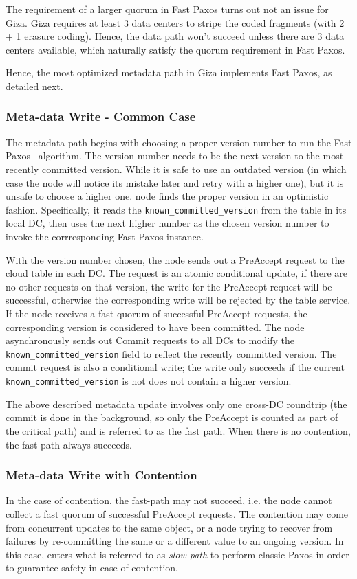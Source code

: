 The requirement of a larger quorum in Fast Paxos turns out not an issue for Giza. Giza requires at least 3 data centers to stripe the coded fragments (with 2 + 1 erasure coding). Hence, the data path won't succeed unless there are 3 data centers available, which naturally satisfy the quorum requirement in Fast Paxos.

Hence, the most optimized metadata path in Giza implements Fast Paxos, as detailed next.

\subsubsection{Meta-data Write - Common Case}
The metadata path begins with
choosing a proper version number to run the Fast Paxos~\cite{fastpaxos} algorithm. The version number needs
to be the next version to the most recently committed version.  While it is safe to use an outdated
version (in which case the {\name} node will notice its mistake later and retry with a higher one),
but it is unsafe to choose a higher one. {\name} node finds the proper version in an
optimistic fashion. Specifically, it reads the {\tt known\_committed\_version} from the
table in its local DC, then uses the next higher number as the chosen version number to 
invoke the corrresponding Fast Paxos instance.

With the version number chosen, the {\name} node sends out a PreAccept request to the cloud table
in each DC. The request is an atomic conditional update, if there are no other 
requests on that version, the write for the PreAccept request will be successful, otherwise
the corresponding write will be rejected by the table service. If the {\name} node receives a fast quorum of successful PreAccept requests, the
corresponding version is considered to have been committed. The {\name} node asynchronously 
sends out Commit requests to all DCs to modify the {\tt known\_committed\_version} field to 
reflect the recently committed version.  The commit request is also a
conditional write; the write only succeeds if the current {\tt
known\_committed\_version} is not does not contain a higher version.

The above described metadata update involves only one cross-DC roundtrip (the
commit is done in the background, so only the PreAccept is counted as part of
the critical path) and is referred to as the fast path.  When there is no
contention, the fast path always succeeds. 

\subsubsection{Meta-data Write with Contention}
In the case of contention, the fast-path may not succeed, i.e. the {\name} node
cannot collect a fast quorum of successful PreAccept requests. The contention
may come from concurrent updates to the same object, or a {\name} node trying
to recover from failures by re-committing the same or a different value to an
ongoing version.  In this case, {\name} enters what is referred to as
\emph{slow path} to perform classic Paxos in order to guarantee safety in case of
contention.

